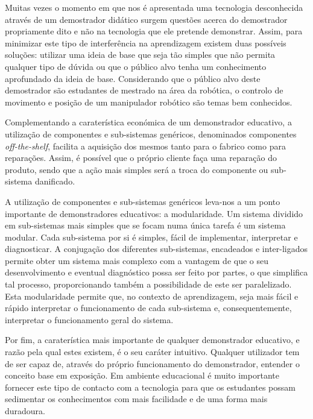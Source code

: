Muitas vezes o momento em que nos é apresentada uma tecnologia desconhecida
através de um demostrador didático surgem questões acerca do demostrador
propriamente dito e não na tecnologia que ele pretende demonstrar. Assim,
para minimizar este tipo de interferência na aprendizagem existem duas
possíveis soluções: utilizar uma ideia de base que seja tão simples que
não permita qualquer tipo de dúvida ou que o público alvo tenha um
conhecimento aprofundado da ideia de base. Considerando que o público alvo
deste demostrador são estudantes de mestrado na área da robótica,
o controlo de movimento e posição de um manipulador robótico são temas
bem conhecidos.

Complementando a caraterística económica de um demonstrador educativo,
a utilização de componentes e sub-sistemas genéricos, denominados
componentes \emph{off-the-shelf}, facilita a aquisição dos mesmos tanto
para o fabrico como para reparações. Assim, é possível que o próprio
cliente faça uma reparação do produto, sendo que a ação mais simples será
a troca do componente ou sub-sistema danificado.


A utilização de componentes e sub-sistemas genéricos leva-nos a um ponto
importante de demonstradores educativos: a modularidade. Um sistema
dividido em sub-sistemas mais simples que se focam numa única tarefa é um
sistema modular. Cada sub-sistema por si é simples, fácil de implementar,
interpretar e diagnosticar. A conjugação dos diferentes sub-sistemas,
encadeados e inter-ligados permite obter um sistema mais complexo com a
vantagem de que o seu desenvolvimento e eventual diagnóstico possa ser
feito por partes, o que simplifica tal processo, proporcionando também a
possibilidade de este ser paralelizado. Esta modularidade permite que,
no contexto de aprendizagem, seja mais fácil e rápido interpretar o
funcionamento de cada sub-sistema e, consequentemente, interpretar o
funcionamento geral do sistema.

Por fim, a caraterística mais importante de qualquer demonstrador
educativo, e razão pela qual estes existem, é o seu caráter intuitivo.
Qualquer utilizador tem de ser capaz de, através do próprio funcionamento
do demonstrador, entender o conceito base em exposição. Em ambiente
educacional é muito importante fornecer este tipo de contacto com a
tecnologia para que os estudantes possam sedimentar os conhecimentos com
mais facilidade e de uma forma mais duradoura. %


